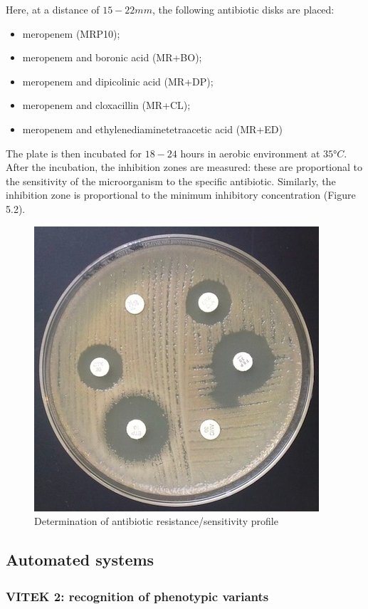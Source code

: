 \documentclass[11pt]{report}
\begin{document}
Here, at a distance of $15-22 mm$, the following antibiotic disks are placed:
\begin{itemize}
\item meropenem (MRP10);
\item meropenem and boronic acid (MR+BO);
\item meropenem and dipicolinic acid (MR+DP);
\item meropenem and cloxacillin (MR+CL);
\item meropenem and ethylenediaminetetraacetic acid (MR+ED)
\end{itemize}

The plate is then incubated for $18-24$ hours in aerobic environment at $35°C$.
After the incubation, the inhibition zones are measured: these are proportional to the sensitivity of the microorganism to the specific antibiotic. 
Similarly, the inhibition zone is proportional to the minimum inhibitory concentration (Figure 5.2).

\begin{figure}[htp]
\centering
\includegraphics[scale=0.93]{img/5disks.jpg}
\caption{Determination of antibiotic resistance/sensitivity profile}
\label{}
\end{figure}

\clearpage
\subsection{Automated systems}
\subsubsection{VITEK\textsuperscript{\textregistered} 2: recognition of phenotypic variants}
\end{document}
